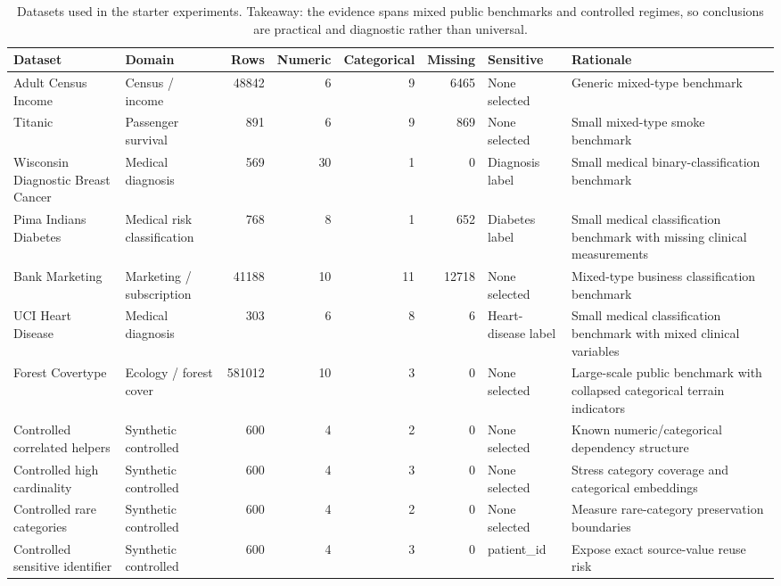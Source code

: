 \begin{table}
\caption{Datasets used in the starter experiments. Takeaway: the evidence spans mixed public benchmarks and controlled regimes, so conclusions are practical and diagnostic rather than universal.}
\label{tab:datasets}
\begin{adjustbox}{max width=\textwidth}
\begin{tabular}{llrrrrll}
\toprule
Dataset & Domain & Rows & Numeric & Categorical & Missing & Sensitive & Rationale \\
\midrule
Adult Census Income & Census / income & 48842 & 6 & 9 & 6465 & None selected & Generic mixed-type benchmark \\
Titanic & Passenger survival & 891 & 6 & 9 & 869 & None selected & Small mixed-type smoke benchmark \\
Wisconsin Diagnostic Breast Cancer & Medical diagnosis & 569 & 30 & 1 & 0 & Diagnosis label & Small medical binary-classification benchmark \\
Pima Indians Diabetes & Medical risk classification & 768 & 8 & 1 & 652 & Diabetes label & Small medical classification benchmark with missing clinical measurements \\
Bank Marketing & Marketing / subscription & 41188 & 10 & 11 & 12718 & None selected & Mixed-type business classification benchmark \\
UCI Heart Disease & Medical diagnosis & 303 & 6 & 8 & 6 & Heart-disease label & Small medical classification benchmark with mixed clinical variables \\
Forest Covertype & Ecology / forest cover & 581012 & 10 & 3 & 0 & None selected & Large-scale public benchmark with collapsed categorical terrain indicators \\
Controlled correlated helpers & Synthetic controlled & 600 & 4 & 2 & 0 & None selected & Known numeric/categorical dependency structure \\
Controlled high cardinality & Synthetic controlled & 600 & 4 & 3 & 0 & None selected & Stress category coverage and categorical embeddings \\
Controlled rare categories & Synthetic controlled & 600 & 4 & 2 & 0 & None selected & Measure rare-category preservation boundaries \\
Controlled sensitive identifier & Synthetic controlled & 600 & 4 & 3 & 0 & patient\_id & Expose exact source-value reuse risk \\
\bottomrule
\end{tabular}
\end{adjustbox}
\end{table}
